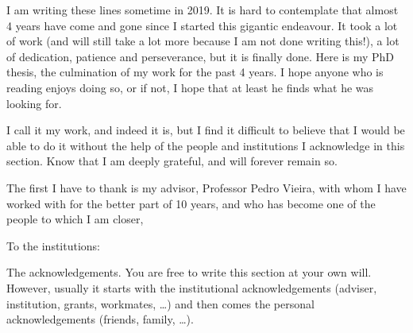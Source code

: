 \acknowledgements

I am writing these lines sometime in 2019. It is hard to contemplate
that almost 4 years have come and gone since I started this gigantic
endeavour. It took a lot of work (and will still take a lot more because
I am not done writing this!), a lot of dedication, patience and
perseverance, but it is finally done. Here is my PhD thesis, the
culmination of my work for the past 4 years. I hope anyone who is
reading enjoys doing so, or if not, I hope that at least he finds what
he was looking for.

I call it my work, and indeed it is, but I find it difficult to believe
that I would be able to do it without the help of the people and
institutions I acknowledge in this section. Know that I am deeply
grateful, and will forever remain so.

The first I have to thank is my advisor, Professor Pedro Vieira, with
whom I have worked with for the better part of 10 years, and who has
become one of the people to which I am closer,

To the institutions: 






The acknowledgements. You are free to write this section at your own will.  However, usually it starts with the institutional acknowledgements (adviser, institution, grants, workmates, \ldots) and then comes the personal acknowledgements (friends, family, \ldots).

